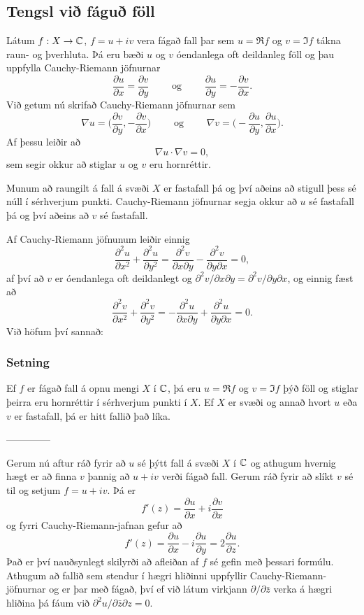 \subsection*{Tengsl við fáguð föll}

Látum $f: X\to {\mathbb C}$, $f=u+iv$ vera fágað fall þar sem $u=\Re f$
og $v=\Im f$ tákna raun- og þverhluta.  Þá eru bæði $u$ og $v$
óendanlega oft deildanleg föll og þau uppfylla Cauchy-Riemann 
jöfnurnar
$$
\dfrac{\partial u}{\partial x}
=\dfrac{\partial v}{\partial y} \qquad \text{ og } \qquad
\dfrac{\partial u}{\partial y}
=-\dfrac{\partial v}{\partial x}.
$$
Við getum nú skrifað Cauchy-Riemann jöfnurnar sem
$$
\nabla u=\big(\dfrac{\partial v}{\partial y},-\dfrac{\partial
v}{\partial x}\big) \qquad \text{ og } \qquad
\nabla v=\big(-\dfrac{\partial u}{\partial y},\dfrac{\partial
u}{\partial x}\big). 
$$
Af þessu leiðir að 
$$
\nabla u\cdot \nabla v=0,
$$
sem segir okkur að stiglar $u$ og $v$ eru hornréttir.

Munum að raungilt á fall á svæði $X$ er fastafall þá og því aðeins að
stigull þess sé núll í sérhverjum punkti.  Cauchy-Riemann jöfnurnar
segja okkur að $u$ sé fastafall þá og því aðeins að $v$ sé fastafall.

Af Cauchy-Riemann jöfnunum leiðir einnig
$$
\dfrac {\partial^2 u}{\partial x^2}+  
\dfrac {\partial^2 u}{\partial y^2}
=\dfrac{\partial^2 v}{\partial x\partial y}  
-\dfrac{\partial^2 v}{\partial y\partial x}=0,  
$$
af því að $v$ er óendanlega oft deildanlegt og
$\partial^2 v/\partial x\partial y=\partial^2 v/\partial y\partial x$,
og einnig fæst að
$$
\dfrac {\partial^2 v}{\partial x^2}+  
\dfrac {\partial^2 v}{\partial y^2}
=-\dfrac{\partial^2 u}{\partial x\partial y}  
+\dfrac{\partial^2 u}{\partial y\partial x}=0.  
$$
Við höfum því sannað:

\subsubsection{Setning}  Ef $f$ er fágað fall á opnu mengi $X$ í ${\mathbb C}$, þá eru 
$u=\Re f$ og $v=\Im f$ þýð föll og stiglar þeirra eru hornréttir í
sérhverjum punkti í $X$.
Ef $X$ er svæði og annað hvort $u$ eða $v$ er fastafall, þá er hitt
fallið það líka.


--------------




Gerum nú aftur ráð fyrir að $u$ sé þýtt fall á svæði $X$ í ${\mathbb C}$
og athugum hvernig hægt er að finna $v$ þannig að $u+iv$ verði fágað
fall.  Gerum ráð fyrir að slíkt $v$ sé til og setjum $f=u+iv$.  Þá
er 
$$
f'(z)=\dfrac{\partial u}{\partial x}+i\dfrac{\partial v}{\partial x}
$$
og fyrri Cauchy-Riemann-jafnan gefur að 
$$
f'(z)=\dfrac{\partial u}{\partial x}-i\dfrac{\partial u}{\partial y}
=2\dfrac{\partial u}{\partial z}.
$$ 
Það er því nauðsynlegt skilyrði að afleiðan af $f$ sé gefin með
þessari formúlu. Athugum að fallið sem stendur í hægri hliðinni
uppfyllir Cauchy-Riemann-jöfnurnar og er þar með fágað, 
því ef við látum virkjann
$\partial/\partial \bar z$ verka á hægri hliðina þá fáum við
$\partial^2u/\partial\bar z \partial z=0$.


